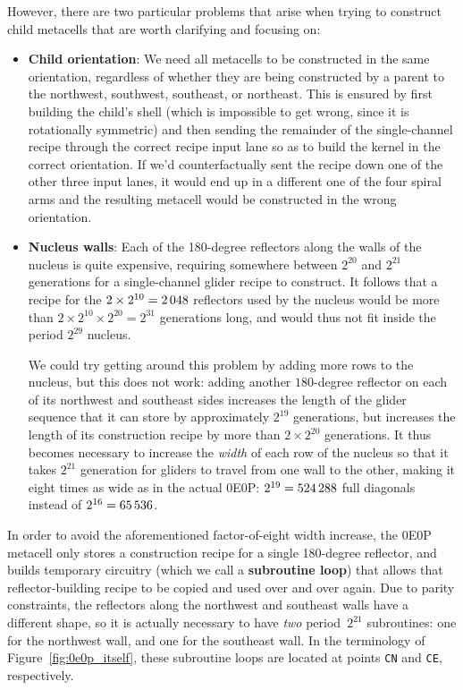 However, there are two particular problems that arise when trying to construct child metacells that are worth clarifying and focusing on:\smallskip

\begin{itemize}
	\item \textbf{Child orientation}: We need all metacells to be constructed in the same orientation, regardless of whether they are being constructed by a parent to the northwest, southwest, southeast, or northeast. This is ensured by first building the child's shell (which is impossible to get wrong, since it is rotationally symmetric) and then sending the remainder of the single-channel recipe through the correct recipe input lane so as to build the kernel in the correct orientation. If we'd counterfactually sent the recipe down one of the other three input lanes, it would end up in a different one of the four spiral arms and the resulting metacell would be constructed in the wrong orientation.\smallskip
	
	\item \textbf{Nucleus walls}: Each of the 180-degree reflectors along the walls of the nucleus is quite expensive, requiring somewhere between $2^{20}$ and $2^{21}$ generations for a single-channel glider recipe to construct. It follows that a recipe for the $2 \times 2^{10} = 2{\,}048$ reflectors used by the nucleus would be more than $2 \times 2^{10} \times 2^{20} = 2^{31}$ generations long, and would thus not fit inside the period $2^{29}$ nucleus.
	
	We could try getting around this problem by adding more rows to the nucleus, but this does not work: adding another $180$-degree reflector on each of its northwest and southeast sides increases the length of the glider sequence that it can store by approximately $2^{19}$ generations, but increases the length of its construction recipe by more than $2 \times 2^{20}$ generations. It thus becomes necessary to increase the \emph{width} of each row of the nucleus so that it takes $2^{21}$ generation for gliders to travel from one wall to the other, making it eight times as wide as in the actual 0E0P: $2^{19} = 524{\,}288$ full diagonals instead of $2^{16} = 65{\,}536$.\smallskip
\end{itemize}

In order to avoid the aforementioned factor-of-eight width increase, the 0E0P metacell only stores a construction recipe for a single 180-degree reflector, and builds temporary circuitry (which we call a \textbf{subroutine loop}) that allows that reflector-building recipe to be copied and used over and over again. Due to parity constraints, the reflectors along the northwest and southeast walls have a different shape, so it is actually necessary to have \emph{two} period~$2^{21}$ subroutines: one for the northwest wall, and one for the southeast wall. In the terminology of Figure~\ref{fig:0e0p_itself}, these subroutine loops are located at points \texttt{CN} and \texttt{CE}, respectively.

